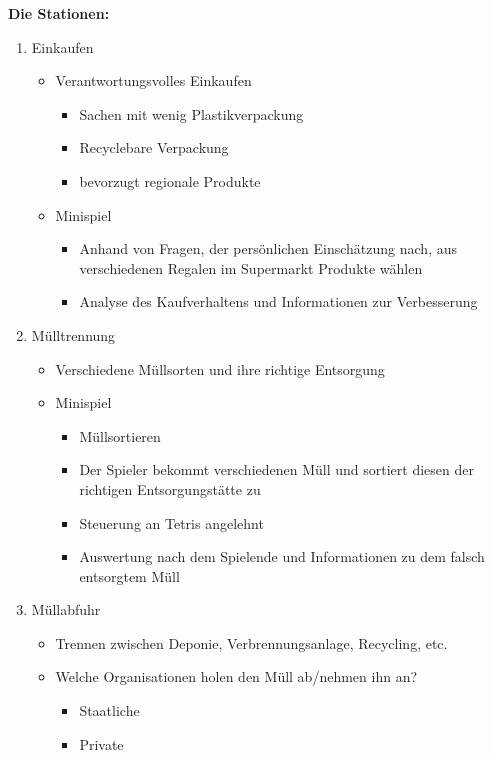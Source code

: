 \documentclass[a4paper]{article}
\begin{document}
\begin{enumerate}
\textbf{Die Stationen:}

\begin{enumerate}

	\item Einkaufen
	\begin{itemize}
		\item Verantwortungsvolles Einkaufen
		\begin{itemize}
			\item Sachen mit wenig Plastikverpackung
			\item Recyclebare Verpackung
			\item bevorzugt regionale Produkte
		\end{itemize}
		\item Minispiel
		\begin{itemize}
			\item Anhand von Fragen, der persönlichen Einschätzung nach, aus verschiedenen Regalen im Supermarkt Produkte wählen
			\item Analyse des Kaufverhaltens und Informationen zur Verbesserung
		\end{itemize}
	\end{itemize}

	\item Mülltrennung
	\begin{itemize}
		\item Verschiedene Müllsorten und ihre richtige Entsorgung
		\item Minispiel
		\begin{itemize}
			\item Müllsortieren
			\item Der Spieler bekommt verschiedenen Müll und sortiert diesen der richtigen Entsorgungstätte zu
			\item Steuerung an Tetris angelehnt
			\item Auswertung nach dem Spielende und Informationen zu dem falsch entsorgtem Müll
		\end{itemize}
	\end{itemize}

	\item Müllabfuhr
	\begin{itemize}
		\item Trennen zwischen Deponie, Verbrennungsanlage, Recycling, etc.
		\item Welche Organisationen holen den Müll ab/nehmen ihn an?
		\begin{itemize}
			\item Staatliche
			\item Private
		\end{itemize}
	\end{itemize}


\end{enumerate}
\end{enumerate}
\end{document}
